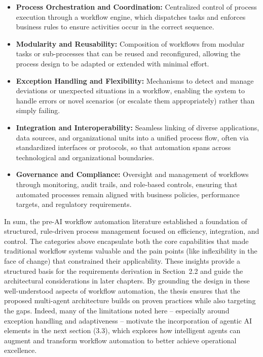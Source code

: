 \begin{itemize}
  \item \textbf{Process Orchestration and Coordination:} Centralized control of process execution through a workflow engine, which dispatches tasks and enforces business rules to ensure activities occur in the correct sequence.
  \item \textbf{Modularity and Reusability:} Composition of workflows from modular tasks or sub-processes that can be reused and reconfigured, allowing the process design to be adapted or extended with minimal effort.
  \item \textbf{Exception Handling and Flexibility:} Mechanisms to detect and manage deviations or unexpected situations in a workflow, enabling the system to handle errors or novel scenarios (or escalate them appropriately) rather than simply failing.
  \item \textbf{Integration and Interoperability:} Seamless linking of diverse applications, data sources, and organizational units into a unified process flow, often via standardized interfaces or protocols, so that automation spans across technological and organizational boundaries.
  \item \textbf{Governance and Compliance:} Oversight and management of workflows through monitoring, audit trails, and role-based controls, ensuring that automated processes remain aligned with business policies, performance targets, and regulatory requirements.
\end{itemize}

In sum, the pre-AI workflow automation literature established a foundation of structured, rule-driven process management focused on efficiency, integration, and control. The categories above encapsulate both the core capabilities that made traditional workflow systems valuable and the pain points (like inflexibility in the face of change) that constrained their applicability. These insights provide a structured basis for the requirements derivation in Section~2.2 and guide the architectural considerations in later chapters. By grounding the design in these well-understood aspects of workflow automation, the thesis ensures that the proposed multi-agent architecture builds on proven practices while also targeting the gaps. Indeed, many of the limitations noted here – especially around exception handling and adaptiveness – motivate the incorporation of agentic AI elements in the next section (3.3), which explores how intelligent agents can augment and transform workflow automation to better achieve operational excellence.

